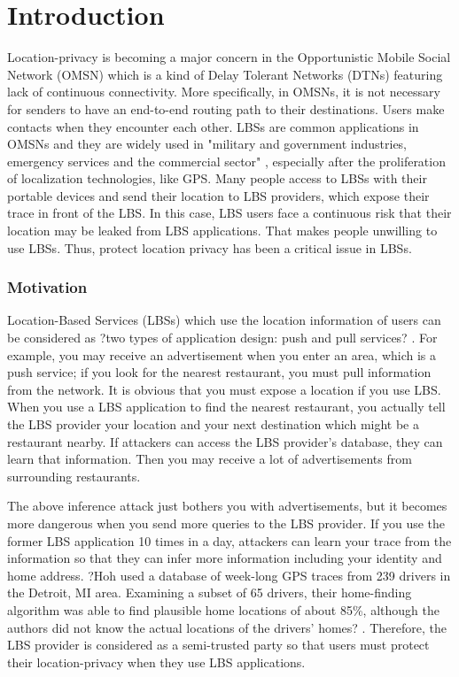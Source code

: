 \chapter {Introduction}
\label{INTRO}
\noindent Location-privacy is becoming a major concern in the Opportunistic Mobile Social Network (OMSN) which is a kind of Delay Tolerant Networks (DTNs) \cite {C1} featuring lack of continuous connectivity. More specifically, in OMSNs, it is not necessary for senders to have an end-to-end routing path to their destinations. Users make contacts when they encounter each other. LBSs are common applications in OMSNs and they are widely used in "military and government industries, emergency services and the commercial sector" \cite {C4}, especially after the proliferation of localization technologies, like GPS. Many people access to LBSs with their portable devices and send their location to LBS providers, which expose their trace in front of the LBS. In this case, LBS users face a continuous risk that their location may be leaked from LBS applications. That makes people unwilling to use LBSs. Thus, protect location privacy has been a critical issue in LBSs.


\subsection{ Motivation}

\noindent Location-Based Services (LBSs) which use the location information of users can be considered as ?two types of application design: push and pull services? \cite {C4}. For example, you may receive an advertisement when you enter an area, which is a push service; if you look for the nearest restaurant, you must pull information from the network. It is obvious that you must expose a location if you use LBS. When you use a LBS application to find the nearest restaurant, you actually tell the LBS provider your location and your next destination which might be a restaurant nearby. If attackers can access the LBS provider's database, they can learn that information. Then you may receive a lot of advertisements from surrounding restaurants.

The above inference attack just bothers you with advertisements, but it becomes more dangerous when you send more queries to the LBS provider. If you use the former LBS application 10 times in a day, attackers can learn your trace from the information so that they can infer more information including your identity and home address. ?Hoh used a database of week-long GPS traces from 239 drivers in the Detroit, MI area. Examining a subset of 65 drivers, their home-finding algorithm was able to find plausible home locations of about 85\%, although the authors did not know the actual locations of the drivers' homes? \cite {C5}. Therefore, the LBS provider is considered as a semi-trusted party so that users must protect their location-privacy when they use LBS applications.

